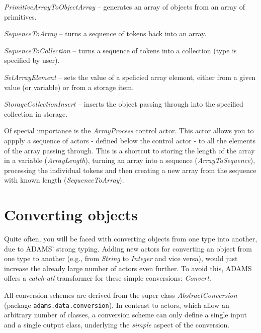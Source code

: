 \begin{tight_itemize}
	\item \textit{PrimitiveArrayToObjectArray} -- generates an array of objects
	from an array of primitives.
	\item \textit{SequenceToArray} -- turns a sequence of tokens back into an
	array.
	\item \textit{SequenceToCollection} -- turns a sequence of tokens into a
	collection (type is specified by user).
	\item \textit{SetArrayElement} -- sets the value of a speficied array 
	element, either from a given value (or variable) or from a storage item.
	\item \textit{StorageCollectionInsert} -- inserts the object passing through
	into the specified collection in storage.
\end{tight_itemize}
Of special importance is the \textit{ArrayProcess} control actor. This actor
allows you to appply a sequence of actors - defined below the control actor - to
all the elements of the array passing through. This is a shortcut to storing the
length of the array in a variable (\textit{ArrayLength}), turning an array into
a sequence (\textit{ArrayToSequence}), processing the individual tokens and then
creating a new array from the sequence with known length
(\textit{SequenceToArray}).

\newpage
\section{Converting objects}
\label{converting_objects}
Quite often, you will be faced with converting objects from one type into
another, due to ADAMS' strong typing. Adding new actors for converting an object
from one type to another (e.g., from \textit{String} to \textit{Integer} and 
vice versa), would just increase the already large number of actors even
further. To avoid this, ADAMS offers a \textit{catch-all} transformer for these
simple conversions: \textit{Convert}. 

All conversion schemes are derived from the super class
\textit{AbstractConversion} (package \texttt{adams.data.conversion}).
In contrast to actors, which allow an arbitrary number of classes, a conversion scheme can only define
a single input and a single output class, underlying the \textit{simple} aspect
of the conversion.

